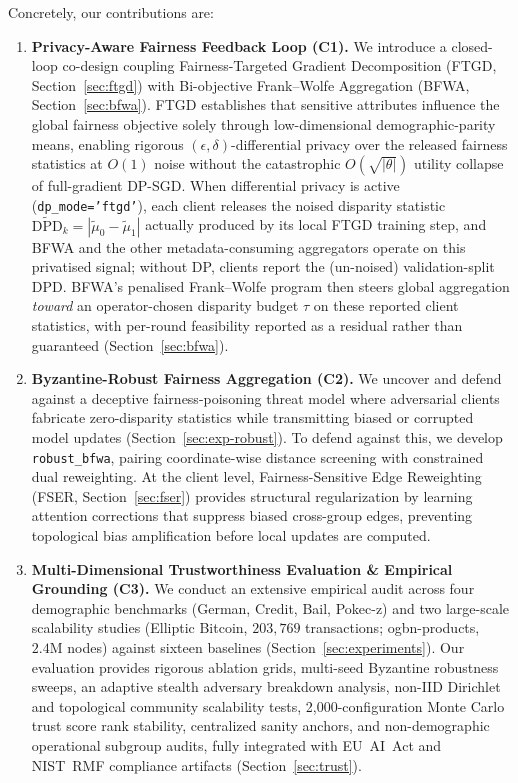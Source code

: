 \documentclass[pdflatex,sn-mathphys-num]{sn-jnl}
\theoremstyle{thmstyleone}%
\theoremstyle{thmstyletwo}%
\theoremstyle{thmstylethree}%
\begin{document}
\medskip
\noindent Concretely, our contributions are:
\begin{enumerate}
\item \textbf{Privacy-Aware Fairness Feedback Loop (C1).} We introduce a closed-loop co-design coupling Fairness-Targeted Gradient Decomposition (FTGD, Section~\ref{sec:ftgd}) with Bi-objective Frank--Wolfe Aggregation (BFWA, Section~\ref{sec:bfwa}). FTGD establishes that sensitive attributes influence the global fairness objective solely through low-dimensional demographic-parity means, enabling rigorous $(\epsilon,\delta)$-differential privacy over the released fairness statistics at $O(1)$ noise without the catastrophic $O(\sqrt{|\theta|})$ utility collapse of full-gradient DP-SGD. When differential privacy is active (\texttt{dp\_mode='ftgd'}), each client releases the noised disparity statistic $\widetilde{\mathrm{DPD}}_k = |\tilde\mu_0 - \tilde\mu_1|$ actually produced by its local FTGD training step, and BFWA and the other metadata-consuming aggregators operate on this privatised signal; without DP, clients report the (un-noised) validation-split DPD. BFWA's penalised Frank--Wolfe program then steers global aggregation \emph{toward} an operator-chosen disparity budget $\tau$ on these reported client statistics, with per-round feasibility reported as a residual rather than guaranteed (Section~\ref{sec:bfwa}).

\item \textbf{Byzantine-Robust Fairness Aggregation (C2).} We uncover and defend against a deceptive fairness-poisoning threat model where adversarial clients fabricate zero-disparity statistics while transmitting biased or corrupted model updates (Section~\ref{sec:exp-robust}). To defend against this, we develop \texttt{robust\_bfwa}, pairing coordinate-wise distance screening with constrained dual reweighting. At the client level, Fairness-Sensitive Edge Reweighting (FSER, Section~\ref{sec:fser}) provides structural regularization by learning attention corrections that suppress biased cross-group edges, preventing topological bias amplification before local updates are computed.

\item \textbf{Multi-Dimensional Trustworthiness Evaluation \& Empirical Grounding (C3).} We conduct an extensive empirical audit across four demographic benchmarks (German, Credit, Bail, Pokec-z) and two large-scale scalability studies (Elliptic Bitcoin, $203{,}769$ transactions; ogbn-products, $2.4\text{M}$ nodes) against sixteen baselines (Section~\ref{sec:experiments}). Our evaluation provides rigorous ablation grids, multi-seed Byzantine robustness sweeps, an adaptive stealth adversary breakdown analysis, non-IID Dirichlet and topological community scalability tests, 2,000-configuration Monte Carlo trust score rank stability, centralized sanity anchors, and non-demographic operational subgroup audits, fully integrated with EU~AI~Act and NIST~RMF compliance artifacts (Section~\ref{sec:trust}).
\end{enumerate}
\end{document}
